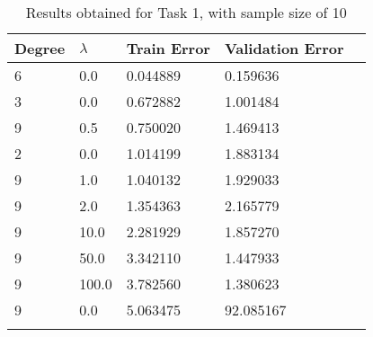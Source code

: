 \def\arraystretch{1.25}
\begin{center}
\begin{longtable}{l l l l l}
\hline
\hline
\textbf{Degree} & \textbf{$\lambda$} & \textbf{Train Error} & \textbf{Validation Error} \\
\hline
\hline
6 & 0.0 & 0.044889 & 0.159636 \\
3 & 0.0 & 0.672882 & 1.001484 \\
9 & 0.5 & 0.750020 & 1.469413 \\
2 & 0.0 & 1.014199 & 1.883134 \\
9 & 1.0 & 1.040132 & 1.929033 \\
9 & 2.0 & 1.354363 & 2.165779 \\
9 & 10.0 & 2.281929 & 1.857270 \\
9 & 50.0 & 3.342110 & 1.447933 \\
9 & 100.0 & 3.782560 & 1.380623 \\
9 & 0.0 & 5.063475 & 92.085167 \\
\hline
\caption{Results obtained for Task 1, with sample size of 10}
\end{longtable}
\end{center}